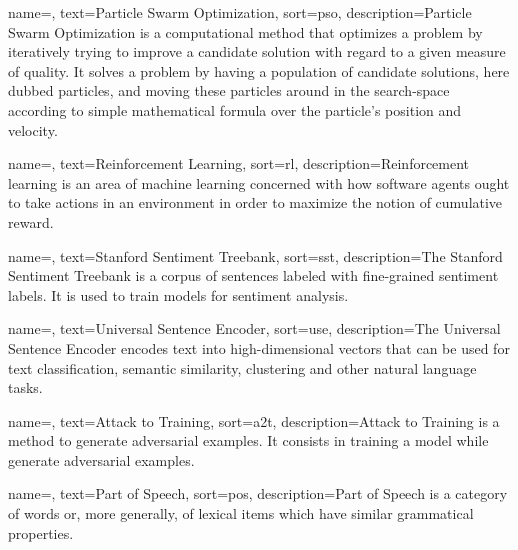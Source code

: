 {
    name=,
    text=Particle Swarm Optimization,
    sort=pso,
    description={Particle Swarm Optimization is a computational method that optimizes a problem by iteratively trying to improve a candidate solution with regard to a given measure of quality. It solves a problem by having a population of candidate solutions, here dubbed particles, and moving these particles around in the search-space according to simple mathematical formula over the particle's position and velocity.}
}

{
    name=,
    text=Reinforcement Learning,
    sort=rl,
    description={Reinforcement learning is an area of machine learning concerned with how software agents ought to take actions in an environment in order to maximize the notion of cumulative reward.}
}


{
    name=,
    text=Stanford Sentiment Treebank,
    sort=sst,
    description={The Stanford Sentiment Treebank is a corpus of sentences labeled with fine-grained sentiment labels. It is used to train models for sentiment analysis.}
}

{
    name=,
    text=Universal Sentence Encoder,
    sort=use,
    description={The Universal Sentence Encoder encodes text into high-dimensional vectors that can be used for text classification, semantic similarity, clustering and other natural language tasks.}
}

{
    name=,
    text=Attack to Training,
    sort=a2t,
    description={Attack to Training is a method to generate adversarial examples. It consists in training a model while generate adversarial examples.}
}

{
    name=,
    text=Part of Speech,
    sort=pos,
    description={Part of Speech is a category of words or, more generally, of lexical items which have similar grammatical properties.}
}


